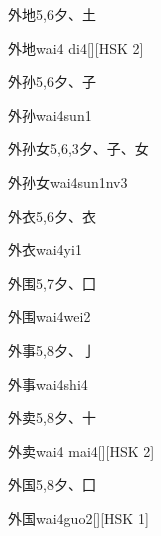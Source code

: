 \begin{entry}{外地}{5,6}{⼣、⼟}
  \begin{phonetics}{外地}{wai4 di4}[][HSK 2]
  \end{phonetics}
\end{entry}

\begin{entry}{外孙}{5,6}{⼣、⼦}
  \begin{phonetics}{外孙}{wai4sun1}
  \end{phonetics}
\end{entry}

\begin{entry}{外孙女}{5,6,3}{⼣、⼦、⼥}
  \begin{phonetics}{外孙女}{wai4sun1nv3}
  \end{phonetics}
\end{entry}

\begin{entry}{外衣}{5,6}{⼣、⾐}
  \begin{phonetics}{外衣}{wai4yi1}
  \end{phonetics}
\end{entry}

\begin{entry}{外围}{5,7}{⼣、⼞}
  \begin{phonetics}{外围}{wai4wei2}
  \end{phonetics}
\end{entry}

\begin{entry}{外事}{5,8}{⼣、⼅}
  \begin{phonetics}{外事}{wai4shi4}
  \end{phonetics}
\end{entry}

\begin{entry}{外卖}{5,8}{⼣、⼗}
  \begin{phonetics}{外卖}{wai4 mai4}[][HSK 2]
  \end{phonetics}
\end{entry}

\begin{entry}{外国}{5,8}{⼣、⼞}
  \begin{phonetics}{外国}{wai4guo2}[][HSK 1]
  \end{phonetics}
\end{entry}

